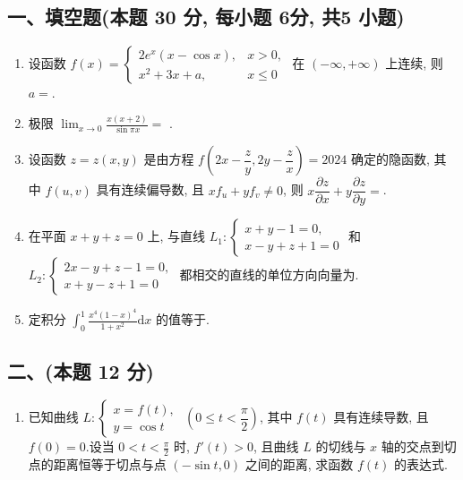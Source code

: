 \subsection*{一、填空题(本题 30 分,  每小题 6分,  共5 小题)}
\begin{enumerate}
    \item 设函数
          $f(x) = \begin{cases}
                  2e^x(x - \cos x), & x > 0,   \\
                  x^2 + 3x + a,     & x \leq 0
              \end{cases}$
          在 $(-\infty, +\infty)$ 上连续, 则 $a =$\underline{\quad \quad}.
    \item 极限 $\displaystyle\lim_{x \to 0} \frac{x(x + 2)}{\sin \pi x} =$ \underline{\quad \quad}.
    \item 设函数 $z = z(x, y)$ 是由方程 $f\left(2x - \dfrac{z}{y}, 2y - \dfrac{z}{x}\right) = 2024$ 确定的隐函数, 其中 $f(u, v)$ 具有连续偏导数, 且 $xf_u + yf_v \neq 0$, 则 $x \dfrac{\partial z}{\partial x} + y \dfrac{\partial z}{\partial y} =$\underline{\quad \quad}.
    \item 在平面 $x + y + z = 0$ 上, 与直线
          $L_1: \begin{cases}
                  x + y - 1 = 0, \\
                  x - y + z + 1 = 0
              \end{cases}$
          和
          $L_2: \begin{cases}
                  2x - y + z - 1 = 0, \\
                  x + y - z + 1 = 0
              \end{cases}$
          都相交的直线的单位方向向量为\underline{\quad \quad}.
    \item 定积分 $\displaystyle\int_{0}^{1} \frac{x^4(1 - x)^4}{1 + x^2} \mathrm{d}x$ 的值等于\underline{\quad \quad}.
\end{enumerate}

\subsection*{二、(本题 12 分)}
\begin{enumerate}
    \item 已知曲线 $L: \begin{cases}
                  x = f(t), \\
                  y = \cos t
              \end{cases}$ \quad $(0 \leq t < \dfrac{\pi}{2})$, 其中 $f(t)$ 具有连续导数, 且 $f(0) = 0$.设当 $0 < t < \frac{\pi}{2}$ 时, $f'(t) > 0$, 且曲线 $L$ 的切线与 $x$ 轴的交点到切点的距离恒等于切点与点 $(-\sin t, 0)$ 之间的距离, 求函数 $f(t)$ 的表达式.
\end{enumerate}

